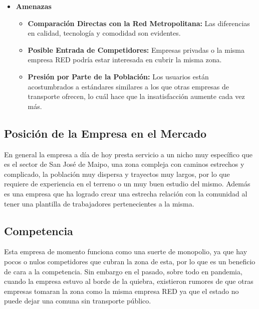 \documentclass[12pt]{article}
\begin{document}
\begin{itemize}
\begin{itemize}
        \item \textbf{Herramientas de Administración Limitadas:} La empresa cuenta con un software que permite consultar si es que los buses están cumpliendo con la frecuencia necesaria, sin embargo hay muchos procesos que se siguen haciendo a mano.
    \end{itemize}
    \item \textbf{Amenazas}
    \begin{itemize}
        \item \textbf{Comparación Directas con la Red Metropolitana:} Las diferencias en calidad, tecnología y comodidad son evidentes.
        \item \textbf{Posible Entrada de Competidores:} Empresas privadas o la misma empresa RED podría estar interesada en cubrir la misma zona.
        \item \textbf{Presión por Parte de la Población:} Los usuarios están acostumbrados a estándares similares a los que otras empresas de transporte ofrecen, lo cuál hace que la insatisfacción aumente cada vez más.
    \end{itemize}
    \end{itemize}
    \subsection{Posición de la Empresa en el Mercado}
    En general la empresa a día de hoy presta servicio a un nicho muy específico que es el sector de San José de Maipo, una zona compleja con caminos estrechos y complicado, la población muy dispersa y trayectos muy largos, por lo que requiere de experiencia en el terreno o un muy buen estudio del mismo. Además es una empresa que ha logrado crear una estrecha relación con la comunidad al tener una plantilla de trabajadores pertenecientes a la misma.
    \subsection{Competencia}
    Esta empresa de momento funciona como una suerte de monopolio, ya que hay pocos o nulos competidores que cubran la zona de esta, por lo que es un beneficio de cara a la competencia. Sin embargo en el pasado, sobre todo en pandemia, cuando la empresa estuvo al borde de la quiebra, existieron rumores de que otras empresas tomaran la zona como la misma empresa RED ya que el estado no puede dejar una comuna sin transporte público.
    \newpage
\end{document}
